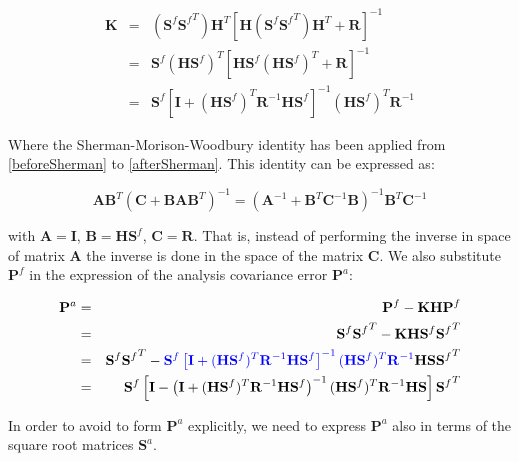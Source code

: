 \documentclass[a4paper,12pt]{article}
\begin{document}
\begin{eqnarray}
\mathbf K  
&=& 
(\mathbf S ^f {\mathbf S ^f}^T) \mathbf H ^T \left[\mathbf H (\mathbf S^f  {\mathbf S^f}^T) \mathbf H^T + \mathbf R  \right]^{-1}\label{beforeSherman}\\
&=& 
\mathbf S ^f (\mathbf H \mathbf S ^f)^T  \left[ \mathbf H \mathbf S^f(\mathbf H \mathbf S^f)^T+\mathbf R  \right]^{-1}\label{beforeSherman}\\
&=&
\mathbf S^f\left[\mathbf I + (\mathbf H \mathbf S^f)^T\mathbf R^{-1} \mathbf H \mathbf S^f \right]^{-1}(\mathbf H \mathbf S^f)^T\mathbf R^{-1}\label{afterSherman}
\end{eqnarray}

Where the Sherman-Morison-Woodbury identity has been applied from \eqref{beforeSherman} to \eqref{afterSherman}. This identity can be expressed as:

\begin{equation}
\mathbf{AB}^T{\left(\mathbf{C}+\mathbf{BAB}^T\right)}^{-1} = 
{\left(\mathbf{A}^{-1}+\mathbf{B}^T\mathbf{C}^{-1}\mathbf{B}\right)}^{-1}\mathbf{B}^T\mathbf{C}^{-1}
\end{equation}

with $\mathbf A = \mathbf I$, $\mathbf B=\mathbf{HS}^f$, $\mathbf{C}=\mathbf{R}$.
That is, instead of performing the inverse in space of matrix $\mathbf{A}$ the inverse is done in the space of the matrix $\mathbf C$. We also substitute $\mathbf P^f$ in the expression of the analysis covariance error $\mathbf P^a$: \newline

\begin{eqnarray}
\mathbf{P}^a
&=&
\mathbf P^f - \mathbf K \mathbf H \mathbf P^f \\
&=&
\mathbf S^f {\mathbf S^f}^T - \mathbf K \mathbf H \mathbf S^f {\mathbf S^f}^T \\
&=&
\mathbf S^f {\mathbf S^f}^T
-
{\color{blue}\mathbf S^f\left[\mathbf I + (\mathbf H \mathbf S^f)^T\mathbf R^{-1} \mathbf H \mathbf S^f\right]^{-1}(\mathbf H \mathbf S^f)^T\mathbf R^{-1}}
\mathbf H \mathbf S {\mathbf S^f}^T \\
&=&
\mathbf S^f 
\left[ 
\mathbf I
-
\left(\mathbf I + (\mathbf H \mathbf S^f)^T\mathbf R^{-1} \mathbf H \mathbf S^f\right)^{-1}(\mathbf H \mathbf S^f)^T\mathbf R^{-1}
\mathbf H \mathbf S 
\right] {\mathbf S^f}^T  \label{eqn:Pa_with_Sf}
\end{eqnarray}

In order to avoid to form $\mathbf P^a$ explicitly, we need to express $\mathbf P^a$ also in terms of the square root matrices $\mathbf S^a$.
\end{document}

